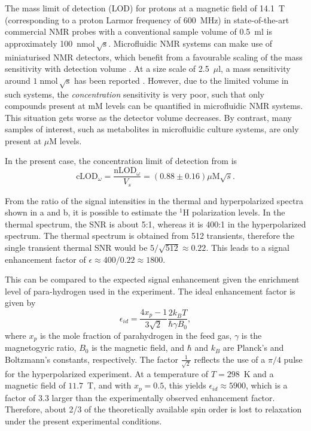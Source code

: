 The mass limit of detection (LOD) for
protons at a magnetic field of 14.1~T (corresponding to a proton Larmor frequency
of 600~MHz) in state-of-the-art commercial NMR probes with a
conventional sample volume of 0.5~ml is approximately
100~$\text{nmol}\,\sqrt{\text{s}}$.
Microfluidic NMR systems can make use of miniaturised NMR detectors,
which benefit from a favourable scaling of the mass sensitivity
with detection volume \cite{Olson:1995vu,Badilita:2011td,Zalesskiy:2014hi}. At a size scale
of 2.5~$\mu\mathrm{l}$, a mass sensitivity around
$1\;\text{nmol}\,\sqrt{\text{s}}$
has been reported \cite{Finch:2016gv}.
However, due to the limited volume in such systems,
the \emph{concentration} sensitivity is very poor, such that
only compounds present at mM levels can be quantified
in microfluidic NMR systems. This situation gets worse as the detector
volume decreases. By contrast, many samples of interest, such as
metabolites in microfluidic culture systems, are only present
at $\mu$M levels.

In the present
case, the concentration limit of detection from  is
\begin{equation}
\text{cLOD}_\omega =
\frac{\text{nLOD}_\omega}{V_s} = (0.88 ± 0.16)\mu\text{M}\sqrt{s}.
\end{equation}

From the ratio of the signal intensities in the thermal and hyperpolarized
spectra shown in a and b, it is possible to estimate the
$\mathrm{^1H}$ polarization levels. In the thermal spectrum, the SNR is about
5:1, whereas it is 400:1 in the hyperpolarized spectrum. The thermal spectrum is
obtained from 512 transients, therefore the single transient thermal SNR would
be $5/\sqrt{512}\approx 0.22$. This leads to a signal enhancement factor of
$\epsilon\approx 400/0.22 \approx 1800$.

This can be compared to the expected signal enhancement given the enrichment
level of para-hydrogen used in the experiment. The ideal enhancement factor is
given by
\begin{equation}
	\epsilon_{id} =\frac{4x_p-1}{3\sqrt{2}} \frac{2 k_BT}{\hbar \gamma B_0},
\end{equation}
where $x_p$ is the mole fraction of parahydrogen in the feed gas, $\gamma$ is
the magnetogyric ratio, $B_0$ is the magnetic field, and $\hbar$ and $k_B$ are
Planck's and Boltzmann's constants, respectively.
The factor $\frac{1}{\sqrt{2}}$ reflects the use of a $\pi/4$ pulse for the
hyperpolarized experiment. At a temperature of $T=298$~K
and a magnetic field of $11.7$~T, and with $x_p=0.5$, this yields
$\epsilon_{id}\approx 5900$, which is a factor of 3.3 larger than the
experimentally observed enhancement factor. Therefore,
about 2/3 of the theoretically available spin order is lost to relaxation under
the present experimental conditions.

